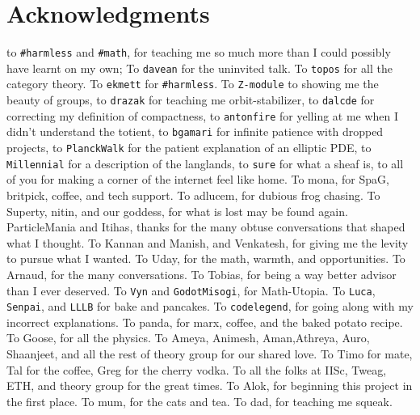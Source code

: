 \documentclass[11pt]{book}
\renewcommand{\baselinestretch}{1.2}
\begin{document}



\newpage
\thispagestyle{empty}
\renewcommand{\thesisdedication}{{\large Copyright \copyright~~Siddharth Bhat, 2021\\}{\large All Rights Reserved\\}}
\thesisdedicationpage



\newpage
\thispagestyle{empty}
\renewcommand{\thesisdedication}{\large To \texttt{\#math} \&\texttt{\#harmless}}
\thesisdedicationpage

\mastersthesis
\renewcommand{\baselinestretch}{1.5}

\chapter*{Acknowledgments}
\label{ch:ack}
to \texttt{\#harmless} and \texttt{\#math}, for teaching me so much more than I
could possibly have learnt on my own; To \texttt{davean} for the uninvited
talk. To \texttt{topos} for all the category theory. To \texttt{ekmett} for
\texttt{\#harmless}. To \texttt{Z-module} to showing me the beauty of groups,
to \texttt{drazak} for teaching me orbit-stabilizer, to \texttt{dalcde} for
correcting my definition of compactness, to \texttt{antonfire} for yelling at
me when I didn't understand the totient, to \texttt{bgamari} for infinite
patience with dropped projects, to \texttt{PlanckWalk} for the patient
explanation of an elliptic PDE, to \texttt{Millennial} for a description of the
langlands, to \texttt{sure} for what a sheaf is, to all of you for making a
corner of the internet feel like home. To mona, for SpaG, britpick, coffee, and
tech support. To adlucem, for dubious frog chasing. To Superty, nitin, and our
goddess, for what is lost may be found again. ParticleMania and Itihas, thanks
for the many obtuse conversations that shaped what I thought. To Kannan and
Manish, and Venkatesh, for giving me the levity to pursue what I wanted. To
Uday, for the math, warmth, and opportunities. To Arnaud, for the many
conversations. To Tobias, for being a way better advisor than I  ever deserved.
To \texttt{Vyn} and \texttt{GodotMisogi}, for Math-Utopia. To \texttt{Luca},
\texttt{Senpai}, and \texttt{LLLB} for bake and pancakes. To
\texttt{codelegend}, for going along with my incorrect explanations. To panda,
for marx, coffee, and the baked potato recipe. To Goose, for all the physics.
To Ameya, Animesh, Aman,Athreya, Auro, Shaanjeet, and all the rest of theory
group for our shared love. To  Timo for mate, Tal for the coffee, Greg for the
cherry vodka. To all the folks at IISc, Tweag,  ETH, and theory group for the
great times. To Alok, for beginning this project in the first place. To mum,
for the cats and tea. To dad, for teaching me squeak.
\end{document}
